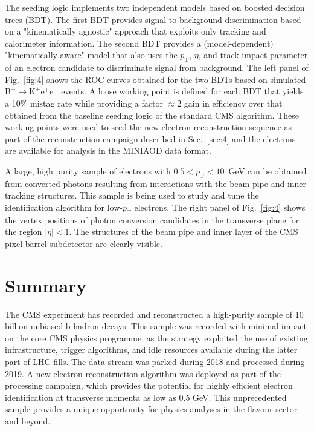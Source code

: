 \documentclass{webofc}
\newcommand{\ee}{\ensuremath{\textrm{e}^+\textrm{e}^-}\xspace}
\newcommand{\btok}{\ensuremath{\textrm{B}^+{\rightarrow}\textrm{K}^+}\xspace}
\newcommand{\btokee}{\ensuremath{\btok\ee}\xspace}
\newcommand{\pt}{\ensuremath{p_\textrm{T}}\xspace}
\begin{document}
The seeding logic implements two independent models based on boosted
decision trees (BDT). The first BDT provides signal-to-background
discrimination based on a "kinematically agnostic" approach that
exploits only tracking and calorimeter information. The second BDT
provides a (model-dependent) "kinematically aware" model that also
uses the \pt, $\eta$, and track impact parameter of an electron
candidate to discriminate signal from background. The left panel of
Fig.~\ref{fig:4} shows the ROC curves obtained for the two BDTs based
on simulated \btokee events. A loose working point is defined for each
BDT that yields a 10\% mistag rate while providing a factor
${\approx}$2 gain in efficiency over that obtained from the baseline
seeding logic of the standard CMS algorithm. These working points were
used to seed the new electron reconstruction sequence as part of the
reconstruction campaign described in Sec.~\ref{sec:4} and the
electrons are available for analysis in the MINIAOD data format.

A large, high purity sample of electrons with $0.5 < \pt < 10$~GeV can
be obtained from converted photons resulting from interactions with
the beam pipe and inner tracking structures. This sample is being used
to study and tune the identification algorithm for low-\pt electrons.
The right panel of Fig.~\ref{fig:4} shows the vertex positions of
photon conversion candidates in the transverse plane for the region
$|\eta| < 1$. The structures of the beam pipe and inner layer of the
CMS pixel barrel subdetector are clearly visible.

\section{Summary}
\label{sec:6}

The CMS experiment has recorded and reconstructed a high-purity sample
of 10 billion unbiased b hadron decays. This sample was recorded with
minimal impact on the core CMS physics programme, as the strategy
exploited the use of existing infrastructure, trigger algorithms, and
idle resources available during the latter part of LHC fills. The data
stream was parked during 2018 and processed during 2019. A new
electron reconstruction algorithm was deployed as part of the
processing campaign, which provides the potential for highly efficient
electron identification at transverse momenta as low as 0.5 GeV. This
unprecedented sample provides a unique opportunity for physics
analyses in the flavour sector and beyond.
\end{document}
